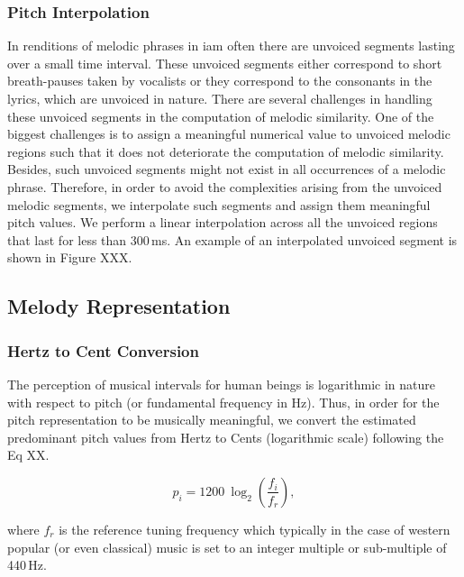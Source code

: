 {\subsubsection{Pitch Interpolation}
\label{sec:data_processing_pitch_interpolation}

In renditions of melodic phrases in \gls{iam} often there are unvoiced segments lasting over a small time interval. These unvoiced segments either correspond to short breath-pauses taken by vocalists or they correspond to the consonants in the lyrics, which are unvoiced in nature. There are several challenges in handling these unvoiced segments in the computation of melodic similarity. One of the biggest challenges is to assign a meaningful numerical value to unvoiced melodic regions such that it does not deteriorate the computation of melodic similarity. Besides, such unvoiced segments might not exist in all occurrences of a melodic phrase. Therefore, in order to avoid the complexities arising from the unvoiced melodic segments, we interpolate such segments and assign them meaningful pitch values. We perform a linear interpolation across all the unvoiced regions that last for less than 300\,ms. An example of an interpolated unvoiced segment is shown in Figure XXX. 


\subsection{Melody Representation} 
\label{sec:pre_processing_melody_representation}


\subsubsection{Hertz to Cent Conversion}
\label{sec:data_processing_cent_conversion}

The perception of musical intervals for human beings is logarithmic in nature with respect to pitch (or fundamental frequency in Hz). Thus, in order for the pitch representation to be musically meaningful,  we convert the estimated predominant pitch values from Hertz to Cents (logarithmic scale) following the Eq XX.

\begin{equation}
\label{eq:hertz_to_cent_conversion}	
p_i = 1200~\log_2\left(\frac{f_i}{f_r}\right) ,
\end{equation}

\noindent where $f_r$ is the reference tuning frequency which typically in the case of western popular (or even classical) music is set to an integer multiple or sub-multiple of 440\,Hz. 

}
